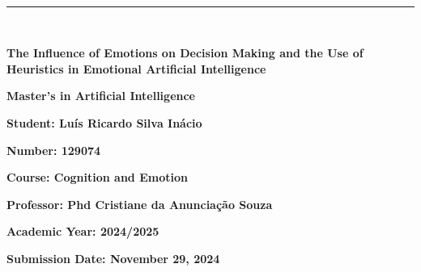 \documentclass[a4paper,12pt]{report}
\begin{document}
	
	\begin{titlepage}
		\centering
		\vspace*{-2cm} %
		
		\hfill%
		\\[0.5cm]
		
		\noindent
		{\color{barraazul}\rule{\textwidth}{1mm}} %
		\\[1cm]
		
		{\LARGE \textbf{The Influence of Emotions on Decision Making and the Use of Heuristics in Emotional Artificial Intelligence} \par}
		\vspace{1.5cm}
		
		{\Large \textbf{Master's in Artificial Intelligence}} \par
		\vspace{1cm}
		
		{\large \textbf{Student: Luís Ricardo Silva Inácio}} \par
		{\large \textbf{Number: 129074}} \par
		\vspace{1cm}
		
		{\large \textbf{Course: Cognition and Emotion}} \par
		\vspace{1cm}
		
		{\large \textbf{Professor: Phd Cristiane da Anunciação Souza}} \par
		\vfill
		
		{\large \textbf{Academic Year: 2024/2025}} \par
		\vspace{0.5cm}
		{\large \textbf{Submission Date: November 29, 2024}} \par
	\end{titlepage}
	
\end{document}

